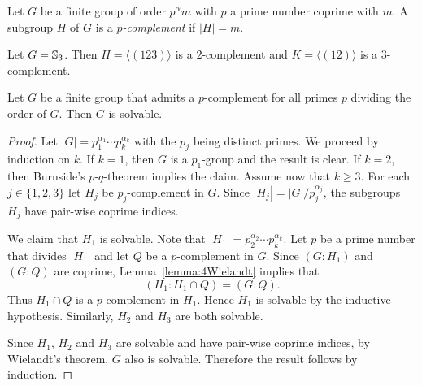 Let $G$ be a finite group of order $p^{\alpha}m$ with $p$ a prime number coprime with $m$. 
A subgroup $H$ of $G$ is a {\em $p$-complement} if $|H|=m$. 

\begin{example}
	Let $G=\mathbb{S}_3$. Then $H=\langle (123)\rangle$ is a $2$-complement 
	and $K=\langle (12)\rangle$ is a $3$-complement.
\end{example}


%

\begin{theorem}[Hall]
	\label{theorem:Hall:solvable}
	Let $G$ be a finite group that admits a $p$-complement for all primes
	$p$ dividing the order of $G$. Then $G$ is solvable. 
\end{theorem}

\begin{proof}
	Let $|G|=p_1^{\alpha_1}\cdots
	p_k^{\alpha_k}$ with the $p_j$ being distinct primes. We proceed by induction on 
	$k$. If $k=1$, then $G$ is a $p_1$-group and the result is clear. If $k=2$, then 
	Burnside's $p$-$q$-theorem implies the claim. Assume now that $k\geq3$. For each 
	$j\in\{1,2,3\}$ let $H_j$ be $p_j$-complement in
	$G$. Since $|H_j|=|G|/p_j^{\alpha_j}$, the subgroups $H_j$ have pair-wise coprime indices. 
	
	We claim that $H_1$ is solvable. Note that $|H_1|=p_2^{\alpha_2}\cdots
	p_k^{\alpha_k}$. Let $p$ be a prime number that divides $|H_1|$ and let $Q$ be a 
	$p$-complement in $G$. 
	Since $(G:H_1)$ and $(G:Q)$ are coprime, Lemma~\ref{lemma:4Wielandt} implies that 
	\[
	(H_1:H_1\cap Q)=(G:Q).
	\]
	Thus $H_1\cap Q$ is a $p$-complement in $H_1$. Hence $H_1$ is
	solvable by the inductive hypothesis. Similarly, $H_2$ and 
	$H_3$ are both solvable. 
	
	Since $H_1$, $H_2$ and $H_3$ are solvable and have  pair-wise coprime indices, by Wielandt's theorem, $G$ also is solvable.
	Therefore the result follows by induction. 
\end{proof}

